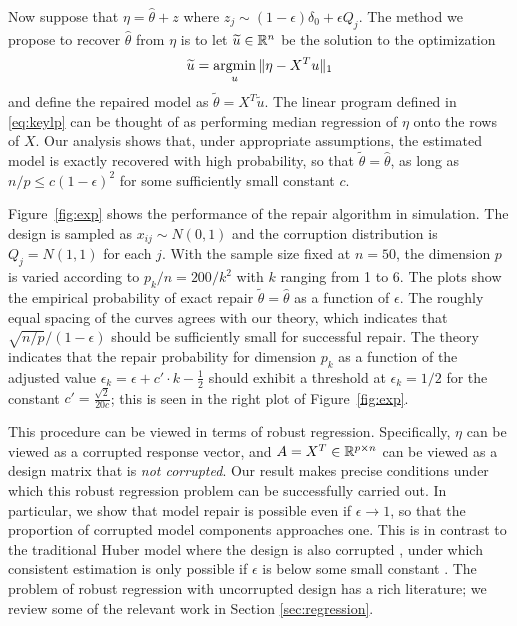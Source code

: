 Now suppose that $\eta = \hat\theta + z$ where $z_j \sim (1-\epsilon) \delta_0 + \epsilon Q_j$. The method we propose to recover $\hat\theta$ from $\eta$ is to let $\widetilde u\in\mathbb{R}^n$ be the solution to the optimization
\begin{equation}
  \tilde u = \argmin_u \| \eta  - X^T u\|_1
  \label{eq:keylp}
\end{equation}
and define the repaired model as $\tilde\theta = X^T\tilde u$.
The linear program defined in \eqref{eq:keylp} can be thought of as performing median regression of $\eta$ onto the rows of $X$.
Our analysis shows that, under appropriate assumptions, the estimated model is exactly recovered with high probability, so that $\tilde \theta = \hat\theta$, as long as $n/p \leq c(1-\epsilon)^2$ for some sufficiently small constant $c$.

Figure~\ref{fig:exp} shows the performance of
the repair algorithm in simulation. The design is sampled as $x_{ij} \sim N(0,1)$ and the corruption distribution is $Q_j = N(1,1)$ for each $j$. With the sample size fixed at $n=50$, the dimension $p$ is varied according to $p_k/n=200/k^2$ with
$k$ ranging from 1 to 6. The plots show the empirical probability of exact repair $\tilde\theta = \hat\theta$ as a function of $\epsilon$. The roughly equal spacing of the curves agrees with our theory, which indicates that $\sqrt{n/p}/(1-\epsilon)$ should be sufficiently small for successful repair. The theory indicates that the repair probability for dimension $p_k$ as a function of the adjusted value $\epsilon_k = \epsilon + c'\cdot k - \frac{1}{2}$ should exhibit a threshold at
$\epsilon_k = 1/2$ for the constant $c' = \frac{\sqrt{2}}{20 c}$; this is seen in the right plot of Figure~\ref{fig:exp}.



 This procedure can be viewed in terms of robust regression. Specifically, $\eta$ can be viewed as a corrupted response vector, and $A = X^T \in \mathbb{R}^{p\times n}$ can be viewed as a design matrix that is \textit{not corrupted}.  Our result makes precise conditions under which this robust regression problem can be successfully carried out.
In particular, we show that model repair is possible even if $\epsilon \to 1$, so that the proportion of corrupted model components approaches one. This is in contrast to the traditional Huber model where the design is also corrupted \citep{huber:64}, under which consistent estimation is only possible if $\epsilon$ is below some small constant \citep{chen2016,gao2020}. The problem of robust regression with uncorrupted design has a rich literature; we review some of the relevant work in Section \ref{sec:regression}.

